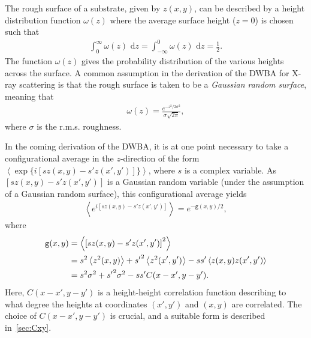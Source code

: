 \documentclass[10pt,twoside, b5paper,pdftex]{report}
\newcommand{\E}[1]{\left\langle #1 \right\rangle}
\begin{document}
The rough surface of a substrate, given by $z(x,y)$, can be described by a height distribution function $\omega(z)$ where the average surface height  ($z = 0$) is chosen such that 
\begin{align}
    \int^{\infty}_{0} \omega\left(z\right) \mbox{ d}z =\int^{0}_{-\infty} \omega\left(z\right) \mbox{ d}z = \frac{1}{2} \label{eq:wz}.	
\end{align}
The function $\omega(z)$ gives the probability distribution of the various heights across the surface. A common assumption in the derivation of the DWBA for X-ray scattering is that the rough surface is taken to be a {\it Gaussian random surface}, meaning that 
\begin{align}
	\omega\left(z\right) = \frac{e^{-z^2/2\sigma^{2}}}{\sigma \sqrt{2\pi}}\label{eq:gaussian},
\end{align}
where $\sigma$ is the r.m.s. roughness. 



In the coming derivation of the DWBA, it is at one point necessary to take a configurational average in the $z$-direction of the form	$\E{\exp{\{i[s z(x,y) - s' z(x',y')]\}}}$, where $s$ is a complex variable. 
As $[s z(x,y) - s' z(x',y')]$ is a Gaussian random variable (under the assumption of a Gaussian random surface), this configurational average yields~\cite{SINHA}
\begin{align}
	\E{e^{i[s z(x,y) - s' z(x',y')]}} = e^{-\mathtt{g}(x,y)/2}, \label{eq:variate}
\end{align}
where 
\begin{align}
	\mathtt{g}(x,y) &= \E{\left[s z(x,y) - s' z(x',y') \right]^2} \notag \\
	&= s^2 \E{z^2(x,y)} + {s'}^2 \E{z^2(x',y')} - s s' \E{z(x,y)z(x',y')}  \notag\\
	&= s^2 \sigma^2 + {s'}^2  \sigma^2 - s s' C(x - x', y - y').
\end{align}
Here, $C(x - x', y - y')$ is a height-height correlation function describing to what degree the heights at coordinates $(x',y')$ and $(x,y)$ are correlated.  The choice of $C(x - x', y - y')$ is crucial, and a suitable form is described in~\cref{sec:Cxy}. 

\newpage
\end{document}
